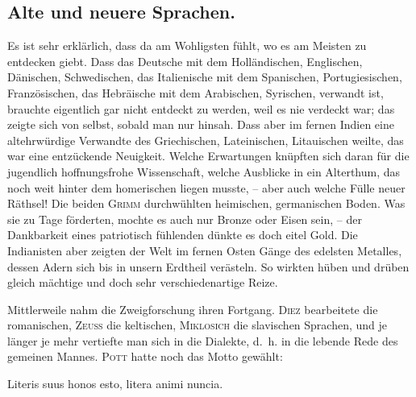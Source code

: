 {\subsection*{Alte und neuere Sprachen.}
Es ist sehr erklärlich, dass  da am Wohligsten fühlt, wo es am Meisten zu entdecken giebt. Dass das Deutsche mit dem Holländischen, \label{sp.173} Englischen, Dänischen, Schwedischen, das Italienische mit dem Spanischen, Portugiesischen, Französischen, das Hebräische mit dem Arabischen, Syrischen,  verwandt ist, brauchte eigentlich gar nicht entdeckt zu werden, weil es nie verdeckt war; das zeigte sich von selbst, sobald man nur hinsah. Dass aber im fernen Indien eine altehrwürdige Verwandte des Griechischen, Lateinischen,  Litauischen weilte, das war eine entzückende Neuigkeit. Welche Erwartungen knüpften sich daran für die jugendlich hoffnungsfrohe Wissenschaft, welche Ausblicke in ein Alterthum, das noch weit hinter dem homerischen liegen musste, – aber auch welche Fülle neuer Räthsel! Die beiden \textsc{Grimm} durchwühlten heimischen, germanischen Boden. Was sie zu Tage förderten, mochte es auch nur Bronze oder Eisen sein, – der Dankbarkeit eines patriotisch fühlenden  dünkte es doch eitel Gold. Die Indianisten aber zeigten der Welt im fernen Osten  Gänge des edelsten Metalles, dessen Adern sich bis in unsern Erdtheil verästeln. So wirkten hüben und drüben gleich mächtige und doch sehr verschiedenartige Reize. 

Mittlerweile nahm die Zweigforschung ihren Fortgang. \textsc{Diez} bearbeitete die romanischen, \textsc{Zeuss} die keltischen, \textsc{Miklosich} die slavischen Sprachen, und je länger je mehr vertiefte man sich in die Dialekte, d.~h. in die lebende Rede des gemeinen Mannes. \textsc{Pott} hatte noch das Motto gewählt:

Literis suus honos esto, litera animi nuncia.

}
